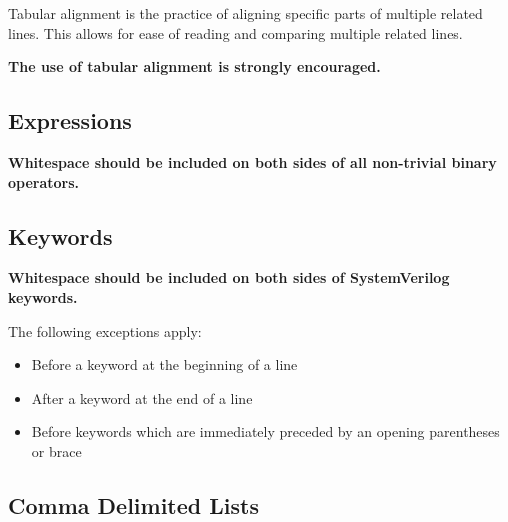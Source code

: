       Tabular alignment is the practice of aligning specific parts of multiple related lines.
      This allows for ease of reading and comparing multiple related lines.

      \textbf{The use of tabular alignment is strongly encouraged.}

      \begin{goodbox}
        
      \end{goodbox}

    \subsection{Expressions}
    \label{systemverilog_conventions:spacing:expressions}

      \textbf{Whitespace should be included on both sides of all non-trivial binary operators.}

      \begin{goodbox}
        
      \end{goodbox}

      \begin{badbox}
        
      \end{badbox}

    \subsection{Keywords}
    \label{systemverilog_conventions:spacing:keywords}

      \textbf{Whitespace should be included on both sides of SystemVerilog keywords.}

      The following exceptions apply:
      \begin{itemize}
        \item Before a keyword at the beginning of a line
        \item After a keyword at the end of a line
        \item Before keywords which are immediately preceded by an opening parentheses or brace
      \end{itemize}


    \subsection{Comma Delimited Lists}
    \label{systemverilog_conventions:spacing:comma_delimited_lists}

